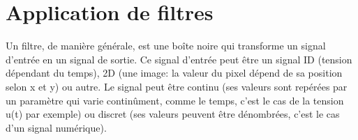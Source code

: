 \documentclass[letterpaper,10pt,english]{jupyterBook}
\begin{document}
\begin{sphinxVerbatimInput}
\begin{sphinxVerbatim}[commandchars=\\\{\}]
       
           
            \PYG{p}{[}\PYG{p}{]}
            \PYG{p}{[}\PYG{p}{]}\PYG{p}{[}\PYG{p}{]}
     
\end{sphinxVerbatim}
\end{sphinxVerbatimInput}
\begin{sphinxVerbatimInput}

\begin{sphinxVerbatim}[commandchars=\\\{\}]
\end{sphinxVerbatim}
\end{sphinxVerbatimInput}
\begin{sphinxVerbatimInput}

\begin{sphinxVerbatim}[commandchars=\\\{\}]
\end{sphinxVerbatim}
\end{sphinxVerbatimInput}
\begin{sphinxVerbatimOutput}

\noindent{}
\end{sphinxVerbatimOutput}


\section{Application de filtres}
\label{\detokenize{notebooks/images/TRAITEMENT-DES-IMAGES:application-de-filtres}}
\sphinxAtStartPar
{}

\sphinxAtStartPar
Un filtre, de manière générale, est une boîte noire qui transforme un signal d’entrée en un signal de sortie. Ce signal d’entrée peut être un signal ID (tension dépendant du temps), 2D (une image: la valeur du pixel dépend de sa position selon x et y) ou autre. Le signal peut être continu (ses valeurs sont repérées par un paramètre qui varie continûment, comme le temps, c’est le cas de la tension u(t) par exemple) ou discret (ses valeurs peuvent être dénombrées, c’est le cas d’un signal numérique).
\end{document}
